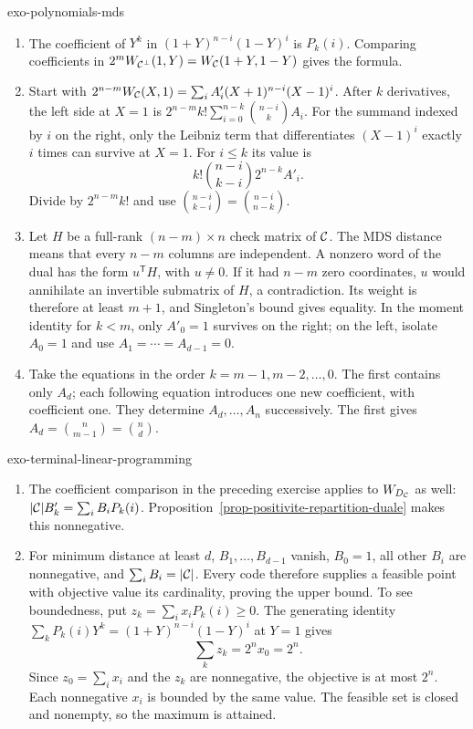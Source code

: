 \begin{correction}{exo-polynomials-mds}
\begin{enumerate}
\item The coefficient of $Y^k$ in $(1+Y)^{n-i}(1-Y)^i$ is $P_k(i)$.
Comparing coefficients in $2^mW_{\mathcal{C}^\bot}(1,Y)=W_{\mathcal{C}}(1+Y,1-Y)$
gives the formula.
\item Start with
$2^{n-m}W_{\mathcal{C}}(X,1)=\sum_i A'_i(X+1)^{n-i}(X-1)^i$.
After $k$ derivatives, the left side at $X=1$ is
$2^{n-m}k!\sum_{i=0}^{n-k}\binom{n-i}{k}A_i$.
For the summand indexed by $i$ on the right, only the Leibniz term
that differentiates $(X-1)^i$ exactly $i$ times can survive at $X=1$.
For $i\leq k$ its value is
\[
 k!\binom{n-i}{k-i}2^{n-k}A'_i.
\]
Divide by $2^{n-m}k!$ and use
$\binom{n-i}{k-i}=\binom{n-i}{n-k}$.
\item Let $H$ be a full-rank $(n-m)\times n$ check matrix of $\mathcal{C}$.
The MDS distance means that every $n-m$ columns are independent.
A nonzero word of the dual has the form $u^{\mathsf T}H$, with $u\ne0$.
If it had $n-m$ zero coordinates, $u$ would annihilate an invertible
submatrix of $H$, a contradiction. Its weight is therefore at least
$m+1$, and Singleton's bound gives equality. In the moment identity
for $k<m$, only $A'_0=1$ survives on the right; on the left, isolate
$A_0=1$ and use $A_1=\cdots=A_{d-1}=0$.
\item Take the equations in the order $k=m-1,m-2,\ldots,0$. The first
contains only $A_d$; each following equation introduces one new
coefficient, with coefficient one. They determine $A_d,\ldots,A_n$
successively. The first gives
$A_d=\binom n{m-1}=\binom nd$.
\end{enumerate}
\end{correction}

\begin{correction}{exo-terminal-linear-programming}
\begin{enumerate}
\item The coefficient comparison in the preceding exercise applies to
$W_{D_{\mathcal{C}}}$ as well: $|\mathcal{C}|B'_k=\sum_i B_iP_k(i)$. Proposition~\ref{prop-positivite-repartition-duale}
makes this nonnegative.
\item For minimum distance at least $d$, $B_1,\ldots,B_{d-1}$ vanish,
$B_0=1$, all other $B_i$ are nonnegative, and $\sum_iB_i=|\mathcal{C}|$.
Every code therefore supplies a feasible point with objective value its
cardinality, proving the upper bound.
To see boundedness, put $z_k=\sum_i x_iP_k(i)\geq0$. The generating
identity $\sum_kP_k(i)Y^k=(1+Y)^{n-i}(1-Y)^i$ at $Y=1$ gives
\[
 \sum_k z_k=2^n x_0=2^n.
\]
Since $z_0=\sum_i x_i$ and the $z_k$ are nonnegative, the objective
is at most $2^n$. Each nonnegative $x_i$ is bounded by the same value.
The feasible set is closed and nonempty, so the maximum is attained.
\end{enumerate}
\end{correction}
